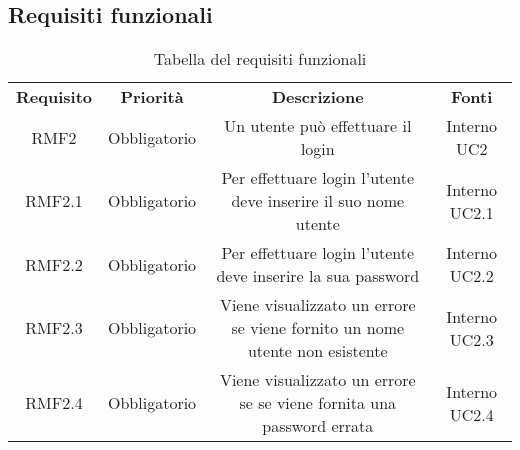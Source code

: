 \subsection{Requisiti funzionali}
	
	\begin{table} [h!]
		\caption{Tabella del requisiti funzionali}
		\begin{center}
			\renewcommand{\arraystretch}{4}
			\begin{tabular} { c c c c}
				\rowcolor{lightgray}
				\textbf{Requisito} & \textbf{Priorità} & \textbf{Descrizione}  & \textbf{Fonti} \\
				RMF2   & Obbligatorio & Un utente può effettuare il login & Interno UC2 \\
				RMF2.1 & Obbligatorio & Per effettuare login l'utente deve inserire il suo nome utente & Interno UC2.1 \\
				RMF2.2 & Obbligatorio & Per effettuare login l'utente deve inserire la sua password & Interno UC2.2 \\
				RMF2.3 & Obbligatorio & Viene visualizzato un errore se viene fornito un nome utente non esistente & Interno UC2.3 \\
				RMF2.4 & Obbligatorio & Viene visualizzato un errore se se viene fornita una password errata & Interno UC2.4 \\
				
			\end{tabular}
		
	\end{center}
\end{table}

